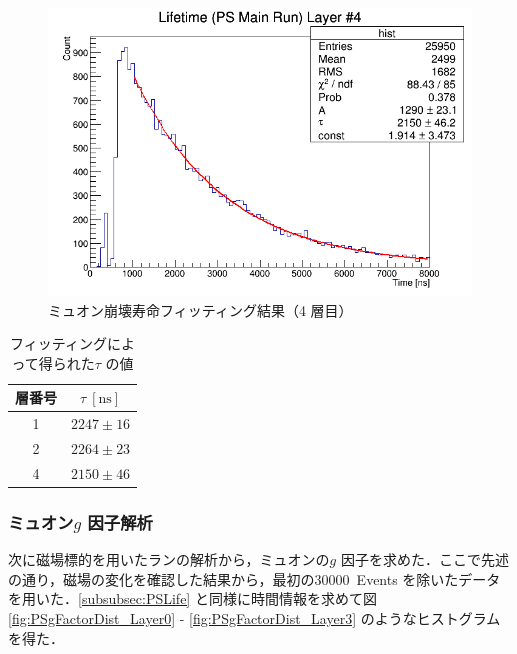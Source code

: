 \begin{figure}[h]
\begin{minipage}{0.45\textwidth}
	\includegraphics[width = \textwidth]{figure/odagawa/PSLifetimeFit_Layer3.png}
	\caption{ミュオン崩壊寿命フィッティング結果（4 層目）}
	\label{fig:PSLifeFit_Layer3}
	\end{minipage}
\end{figure}%

\begin{table}[h]
	\centering
	\caption{フィッティングによって得られた$\tau$ の値}
	\begin{tabular}{cc}\toprule
	層番号 & $\tau~[\mathrm{ns}]$ \\ \midrule
	1 & $2247 \pm 16$ \\
	2 & $2264 \pm 23$ \\
	4 & $2150 \pm 46$ \\ \bottomrule
	\end{tabular}\label{tab:PSLifetime}
\end{table}%

\newpage

\subsubsection{ミュオン$g$ 因子解析}
\label{subsubsec:PSgFactor}
次に磁場標的を用いたランの解析から，ミュオンの$g$ 因子を求めた．ここで先述の通り，磁場の変化を確認した結果から，最初の30000~Events を除いたデータを用いた．\ref{subsubsec:PSLife} と同様に時間情報を求めて図\ref{fig:PSgFactorDist_Layer0} - \ref{fig:PSgFactorDist_Layer3} のようなヒストグラムを得た．


